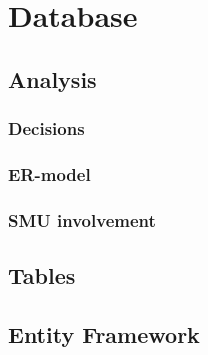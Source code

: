 \section{Database}
\label{Design_Database}

\subsection{Analysis}
\label{Design_Database_Analysis}

\subsubsection{Decisions}
\label{Design_Database_Analysis_Decisions}

\subsubsection{ER-model}
\label{Design_Database_Analysis_ERmodel}

\subsubsection{SMU involvement}
\label{Design_Database_Analysis_SMU}

\subsection{Tables}
\label{Design_Database_Tables}

\subsection{Entity Framework}
\label{Design_Database_EntityFramework}
